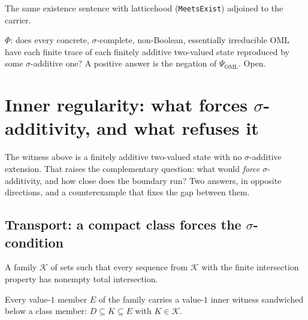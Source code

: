 \begin{definition}
\label{def:psi-oml}
\leanok
{}
The same existence sentence with latticehood (\texttt{MeetsExist}) adjoined to
the carrier.
\end{definition}

\begin{remark}[$\Phi$]
\label{rmk:phi-open}
$\Phi$: does every concrete, $\sigma$-complete, non-Boolean, essentially
irreducible OML have each finite trace of each finitely additive two-valued
state reproduced by some $\sigma$-additive one? A positive answer is the
negation of $\Psi_{\mathrm{OML}}$. Open.
\end{remark}
\section{Inner regularity: what forces $\sigma$-additivity, and what refuses it}

The witness above is a finitely additive two-valued state with no $\sigma$-additive
extension. That raises the complementary question: what would \emph{force}
$\sigma$-additivity, and how close does the boundary run? Two answers, in
opposite directions, and a counterexample that fixes the gap between them.

\subsection{Transport: a compact class forces the $\sigma$-condition}

\begin{definition}
  \label{def:countably-compact-class}
  \leanok
  A family $\mathcal{K}$ of sets such that every sequence from $\mathcal{K}$
  with the finite intersection property has nonempty total intersection.
\end{definition}

\begin{definition}
  \label{def:approximates-on}
  \leanok
  Every value-$1$ member $E$ of the family carries a value-$1$ inner witness
  sandwiched below a class member: $D \subseteq K \subseteq E$ with
  $K \in \mathcal{K}$.
\end{definition}


